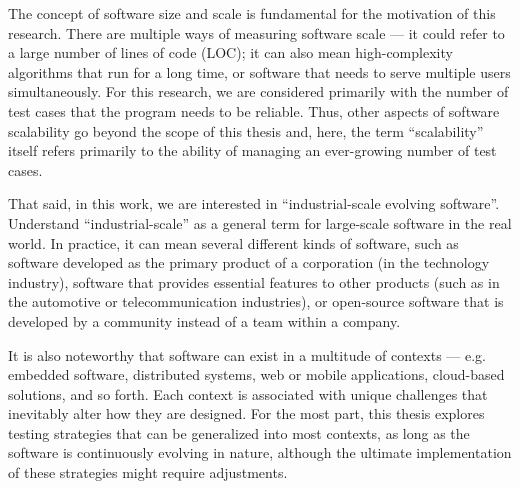 The concept of software size and scale is fundamental for the motivation of this research.
There are multiple ways of measuring software scale — it could refer to a large number of lines of code (LOC); it can also mean high-complexity algorithms that run for a long time, or software that needs to serve multiple users simultaneously.
For this research, we are considered primarily with the number of test cases that the program needs to be reliable.
Thus, other aspects of software scalability go beyond the scope of this thesis and, here, the term ``scalability'' itself refers primarily to the ability of managing an ever-growing number of test cases.

That said, in this work, we are interested in ``industrial-scale evolving software''.
Understand ``industrial-scale'' as a general term for large-scale software in the real world.
In practice, it can mean several different kinds of software, such as software developed as the primary product of a corporation (in the technology industry), software that provides essential features to other products (such as in the automotive or telecommunication industries), or open-source software that is developed by a community instead of a team within a company.

It is also noteworthy that software can exist in a multitude of contexts — e.g. embedded software, distributed systems, web or mobile applications, cloud-based solutions, and so forth.
Each context is associated with unique challenges that inevitably alter how they are designed.
For the most part, this thesis explores testing strategies that can be generalized into most contexts, as long as the software is continuously evolving in nature, although the ultimate implementation of these strategies might require adjustments.
